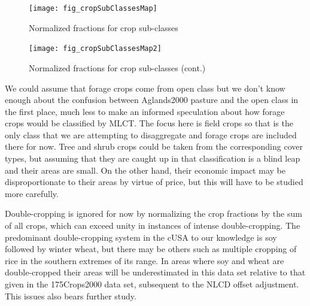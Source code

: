 \begin{figure}[hpt] 
  \centering

    \texttt{[image: fig\_cropSubClassesMap]}
  \caption{Normalized fractions for crop sub-classes}
  \label{fig:cropSubClassesMap} 
\end{figure} 

\begin{figure}[hpt] 
  \centering

    \texttt{[image: fig\_cropSubClassesMap2]}
  \caption{Normalized fractions for crop sub-classes (cont.)}
  \label{fig:cropSubClassesMap2} 
\end{figure} 


We could assume that forage crops come from open class but we don't
know enough about the confusion between Aglands2000 pasture and the
open class in the first place, much less to make an informed
speculation about how forage crops would be classified by MLCT.  The
focus here is field crops so that is the only class that we are
attempting to disaggregate and forage crops are included there for
now.  Tree and shrub crops could be taken from the corresponding cover
types, but assuming that they are caught up in that classification is
a blind leap and their areas are small.  On the other hand, their
economic impact may be disproportionate to their areas by virtue of
price, but this will have to be studied more carefully.

Double-cropping is ignored for now by normalizing the crop fractions
by the sum of all crops, which can exceed unity in instances of
intense double-cropping.  The predominant double-cropping system in
the cUSA to our knowledge is soy followed by winter wheat, but there
may be others such as multiple cropping of rice in the southern
extremes of its range.  In areas where soy and wheat are
double-cropped their areas will be underestimated in this data set
relative to that given in the 175Crops2000 data set, subsequent to the
NLCD offset adjustment.  This issues also bears further study.






